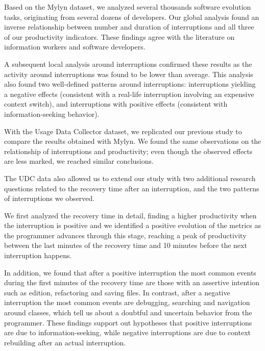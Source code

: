 \documentclass[times]{smrauth}
\begin{document}
Based on the Mylyn dataset, we analyzed several thousands software evolution tasks, originating from several dozens of developers. Our global analysis found an inverse relationship between number and duration of interruptions and all three of our productivity indicators. These findings agree with the literature on information workers and software developers. 

A subsequent local analysis around interruptions confirmed these results as the activity around interruptions was found to be lower than average. This analysis also found two well-defined patterns around interruptions: interruptions yielding a negative effects (consistent with a real-life interruption involving an expensive context switch), and interruptions with positive effects (consistent with information-seeking behavior). %

With the Usage Data Collector dataset, we replicated our previous study to compare the results obtained with Mylyn. We found the same observations on the relationship of interruptions and productivity; even though the observed effects are less marked, we reached similar conclusions.

The UDC data also allowed us to extend our study with two additional research questions related to the recovery time after an interruption, and the two patterns of interruptions we observed. 

We first analyzed the recovery time in detail, finding a higher productivity when the interruption is positive and we identified a positive evolution of the metrics as the programmer advances through this stage, reaching a peak of productivity between the last minutes of the recovery time and 10 minutes before the next interruption happens.  

In addition, we found that after a positive interruption the most common events during the first minutes of the recovery time are those with an assertive intention such as edition, refactoring and saving files. In contrast, after a negative interruption the most common events are debugging, searching and navigation around classes, which tell us about a doubtful and uncertain behavior from the programmer. These findings support out hypotheses that positive interruptions are due to information-seeking, while negative interruptions are due to context rebuilding after an actual interruption.





\end{document}
